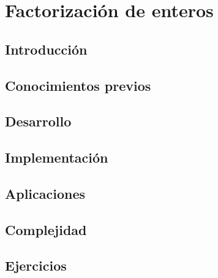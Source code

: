 \chapter{Factorización de enteros}
\section{Introducción}

\section{Conocimientos previos}

\section{Desarrollo}

\section{Implementación}

\section{Aplicaciones}

\section{Complejidad}

\section{Ejercicios}
